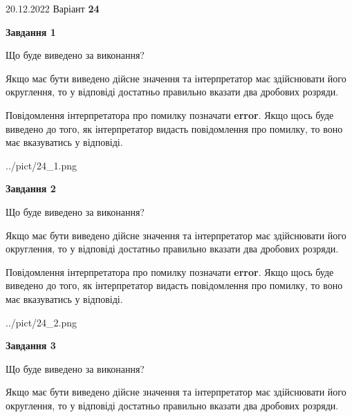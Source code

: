 \documentclass[12pt, ukrainian]{article}
\begin{document}
{20.12.2022 Варіант \No \textbf { 24 }\par}
{
\begin {Large}

{\begin {center}\textbf{Завдання 1}\end {center}}\par
Що буде виведено за виконання? \par

Якщо має бути виведено дійсне значення та інтерпретатор має здійснювати його округлення, 
то у відповіді достатньо правильно вказати два дробових розряди.

Повідомлення інтерпретатора про помилку позначати \textbf{error}.
Якщо щось буде виведено до того, як інтерпретатор видасть повідомлення про помилку, 
то воно має вказуватись у відповіді. \par

\begin{center}
	{../pict/24_1.png}
\end{center}
\newpage

{\begin {center}\textbf{Завдання 2}\end {center}}\par
Що буде виведено за виконання? \par

Якщо має бути виведено дійсне значення та інтерпретатор має здійснювати його округлення, 
то у відповіді достатньо правильно вказати два дробових розряди.

Повідомлення інтерпретатора про помилку позначати \textbf{error}.
Якщо щось буде виведено до того, як інтерпретатор видасть повідомлення про помилку, 
то воно має вказуватись у відповіді. \par

\begin{center}
	{../pict/24_2.png}
\end{center}
\newpage

{\begin {center}\textbf{Завдання 3}\end {center}}\par
Що буде виведено за виконання? \par

Якщо має бути виведено дійсне значення та інтерпретатор має здійснювати його округлення, 
то у відповіді достатньо правильно вказати два дробових розряди.


\end{Large}}
\end{document}
